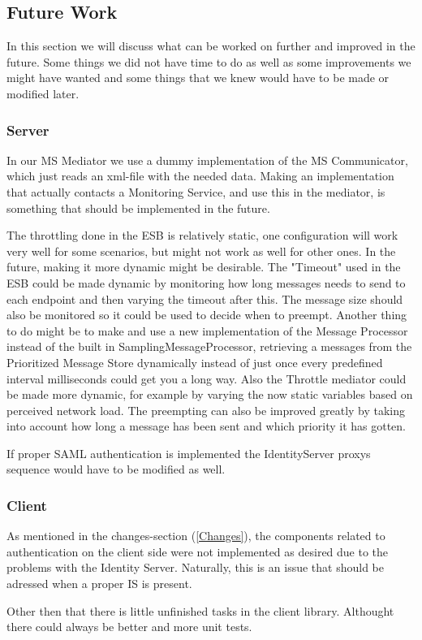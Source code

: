 \subsection{Future Work}\label{Future Work}
    In this section we will discuss what can be worked on further and improved in the future. Some things we did not have time to do as well as some improvements we might have wanted and some things that we knew would have to be made or modified later.

    \subsubsection{Server}\label{Future:Server}
        In our MS Mediator we use a dummy implementation of the MS Communicator, which just reads an xml-file with the needed data. Making an implementation that actually contacts a Monitoring Service, and use this in the mediator, is something that should be implemented in the future.

        The throttling done in the ESB is relatively static, one configuration will work very well for some scenarios, but might not work as well for other ones. In the future, making it more dynamic might be desirable. The "Timeout" used in the ESB could be made dynamic by monitoring how long messages needs to send to each endpoint and then varying the timeout after this. The message size should also be monitored so it could be used to decide when to preempt. Another thing to do might be to make and use a new implementation of the Message Processor instead of the built in SamplingMessageProcessor, retrieving a messages from the Prioritized Message Store dynamically instead of just once every predefined interval milliseconds could get you a long way. Also the Throttle mediator could be made more dynamic, for example by varying the now static variables based on perceived network load. The preempting can also be improved greatly by taking into account how long a message has been sent and which priority it has gotten.

        If proper SAML authentication is implemented the IdentityServer proxys sequence would have to be modified as well.

	\subsubsection{Client}\label{Future:Client}
		As mentioned in the changes-section (\ref{Changes}), the components related to authentication on the client side were not implemented as desired due to the problems with the Identity Server. Naturally, this is an issue that should be adressed when a proper IS is present.
		
    	Other then that there is little unfinished tasks in the client library. Althought there could always be better and more unit tests. 

